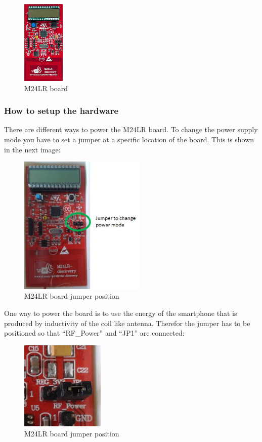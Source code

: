 \documentclass[11pt]{article}
\begin{document}
\begin{figure}[H]

 \centering
 \includegraphics [width=2cm]{M24LRboard.png} 
 \caption{M24LR board\cite{cite7}}
\end{figure}

\subsubsection{How to setup the hardware}
There are different ways to power the M24LR board. To change the power supply mode you have to set a jumper at a specific location of the board. This is shown in the next image:

\begin{figure}[H]

 \centering
 \includegraphics [width=6cm]{jumper.jpg} 
 \caption{M24LR board jumper position}
\end{figure}

One way to power the board is to use the energy of the smartphone that is produced by inductivity of the coil like antenna. Therefor the jumper has to be positioned so that "`RF\_Power"' and "`JP1"' are connected:

\begin{figure}[H]

 \centering
 \includegraphics [width=4cm]{jumper_passive.jpg} 
 \caption{M24LR board jumper position}
\end{figure}
\end{document}
